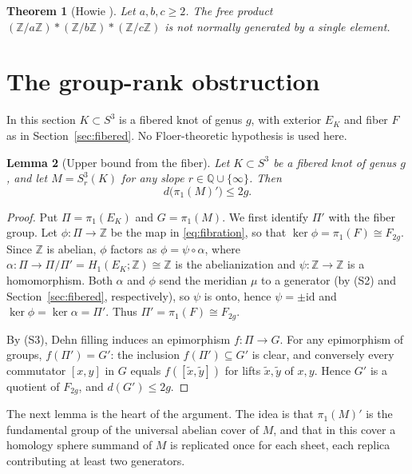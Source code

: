 \documentclass[12pt]{article}
\newcommand{\Z}{\mathbb Z}
\newcommand{\Q}{\mathbb Q}
\newcommand{\Surg}[2]{S^3_{#1}(#2)}
\newcommand{\rk}{d}
\newtheorem{theorem}{Theorem}[section]
\newtheorem{lemma}[theorem]{Lemma}
\theoremstyle{definition}
\theoremstyle{remark}
\begin{document}
\begin{theorem}[Howie {\cite{Howie2002}}]\label{thm:howie}
Let \(a,b,c\geq2\). The free product
\((\Z/a\Z)*(\Z/b\Z)*(\Z/c\Z)\) is not normally generated by a single
element.
\end{theorem}

\section{The group-rank obstruction}\label{sec:rank}

In this section \(K\subset S^3\) is a fibered knot of genus \(g\), with
exterior \(E_K\) and fiber \(F\) as in Section~\ref{sec:fibered}. No
Floer-theoretic hypothesis is used here.

\begin{lemma}[Upper bound from the fiber]\label{lem:fiber}
Let \(K\subset S^3\) be a fibered knot of genus \(g\), and let
\(M=\Surg{r}{K}\) for any slope \(r\in\Q\cup\{\infty\}\). Then
\[
 \rk\bigl(\pi_1(M)'\bigr)\leq 2g.
\]
\end{lemma}

\begin{proof}
Put \(\Pi=\pi_1(E_K)\) and \(G=\pi_1(M)\). We first identify \(\Pi'\)
with the fiber group. Let \(\phi\colon\Pi\to\Z\) be the map in
\eqref{eq:fibration}, so that \(\ker\phi=\pi_1(F)\cong F_{2g}\). Since
\(\Z\) is abelian, \(\phi\) factors as \(\phi=\psi\circ\alpha\), where
\(\alpha\colon\Pi\to\Pi/\Pi'=H_1(E_K;\Z)\cong\Z\) is the abelianization
and \(\psi\colon\Z\to\Z\) is a homomorphism. Both \(\alpha\) and
\(\phi\) send the meridian \(\mu\) to a generator (by (S2) and
Section~\ref{sec:fibered}, respectively), so \(\psi\) is onto, hence
\(\psi=\pm\mathrm{id}\) and \(\ker\phi=\ker\alpha=\Pi'\). Thus
\(\Pi'=\pi_1(F)\cong F_{2g}\).

By (S3), Dehn filling induces an epimorphism \(f\colon\Pi\to G\). For
any epimorphism of groups, \(f(\Pi')=G'\): the inclusion
\(f(\Pi')\subseteq G'\) is clear, and conversely every commutator
\([x,y]\) in \(G\) equals \(f([\tilde x,\tilde y])\) for lifts
\(\tilde x,\tilde y\) of \(x,y\). Hence \(G'\) is a quotient of
\(F_{2g}\), and \(\rk(G')\leq2g\).
\end{proof}

The next lemma is the heart of the argument. The idea is that
\(\pi_1(M)'\) is the fundamental group of the universal abelian cover of
\(M\), and that in this cover a homology sphere summand of \(M\) is
replicated once for each sheet, each replica contributing at least two
generators.
\end{document}
